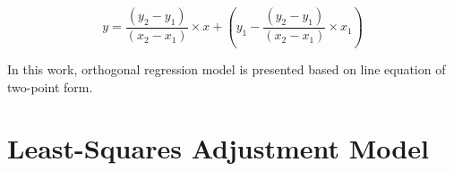 \begin{equation} %
y = \dfrac{(y_2-y_1)}{(x_2-x_1)}\times x+(y_1-\dfrac{(y_2-y_1)}{(x_2-x_1)}\times x_1)
\end{equation}



In this work, orthogonal regression model is presented based on line equation of two-point form.





\section{Least-Squares Adjustment Model}
\label{sec:2.4}







